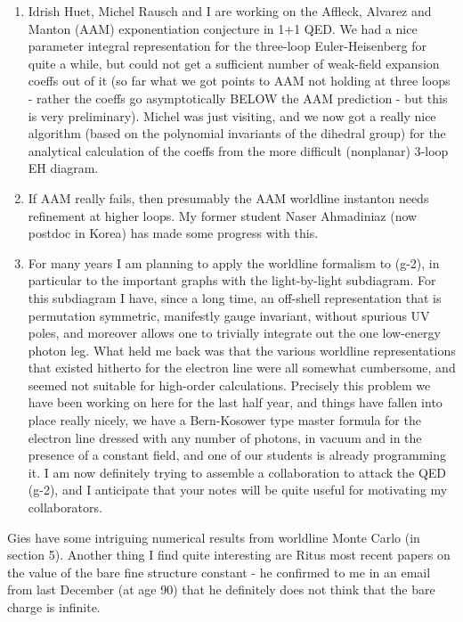 \begin{description}
\begin{enumerate}
  \item
Idrish Huet, Michel Rausch and I are working on the Affleck,
Alvarez and Manton (AAM) exponentiation conjecture in 1+1 QED.
We had a nice parameter integral representation for the three-loop
Euler-Heisenberg for quite a while, but could not get a sufficient number
of weak-field expansion coeffs out of it (so far what we got points to
AAM not holding at three loops - rather the coeffs go asymptotically
BELOW the AAM prediction - but this is very preliminary). Michel was just
visiting, and we now got a really nice algorithm (based on the polynomial
invariants of the dihedral group) for the analytical calculation of the
coeffs from the more difficult (nonplanar) 3-loop EH diagram.
  \item
If AAM really fails, then presumably the AAM worldline instanton needs
refinement at higher loops. My former student Naser Ahmadiniaz (now
postdoc in Korea) has made some progress with this.
  \item
For many years I am planning to apply the worldline formalism to (g-2),
in particular to the important graphs with the
light-by-light subdiagram. For this subdiagram I have, since a long time,
an off-shell representation that is permutation symmetric, manifestly
gauge invariant, without spurious UV poles, and moreover allows one to
trivially integrate out the one low-energy photon leg. What held me back
was that the various worldline representations that existed hitherto for
the electron line were all somewhat cumbersome, and seemed not suitable
for high-order calculations. Precisely this problem we have been working
on here for the last half year, and things have fallen into place really
nicely, we have a Bern-Kosower type master formula for the electron line
dressed with any number of photons, in vacuum and in the presence of a
constant field, and one of our students is already programming it. I am
now definitely trying to assemble a collaboration to attack the QED (g-2),
and I anticipate that your notes will be quite useful for motivating my
collaborators.

\end{enumerate}
Gies \etal{} have some intriguing numerical results from
worldline Monte Carlo (in section 5). Another thing I find quite
interesting are Ritus most recent
papers on the value of the bare fine
structure constant - he confirmed to me in an email from last December
(at age 90) that he definitely does not think that the bare charge is
infinite.


\end{description}
